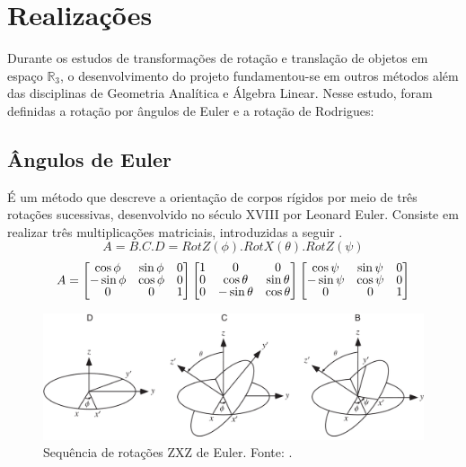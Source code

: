 \chapter{Realizações}\label{chp:realizacoes}

Durante os estudos de transformações de rotação e translação de objetos em espaço \(\mathbb{R}_3\), o desenvolvimento do projeto fundamentou-se em outros métodos além das disciplinas de Geometria Analítica e Álgebra Linear. Nesse estudo, foram definidas a rotação por ângulos de Euler e a rotação de Rodrigues:

\section{Ângulos de Euler}

É um método que descreve a orientação de corpos rígidos por meio de três rotações sucessivas, desenvolvido no século XVIII por Leonard Euler. Consiste em realizar três multiplicações matriciais, introduzidas a seguir \cite{Euler}.
\[ A = B . C . D = RotZ(\phi) . RotX(\theta) . RotZ(\psi) \]
\[ A =
\renewcommand\arraystretch{.8}
\begin{bmatrix}
    \cos \phi & \sin \phi & 0 \\
    -\sin \phi & \cos \phi & 0 \\
    0 & 0 & 1
\end{bmatrix}
\begin{bmatrix}
    1 & 0 & 0 \\
    0 & \cos \theta & \sin \theta \\
    0 & -\sin \theta & \cos \theta
\end{bmatrix}
\begin{bmatrix}
    \cos \psi & \sin \psi & 0 \\
    -\sin \psi & \cos \psi & 0 \\
    0 & 0 & 1
\end{bmatrix} \]
\begin{figure}[ht]
    \centering
    \includegraphics[width=.8\textwidth]{figuras/euler.png}
    \caption{Sequência de rotações ZXZ de Euler. Fonte: \cite{Euler}.}
    \label{fig:euler_rot}
\end{figure}

